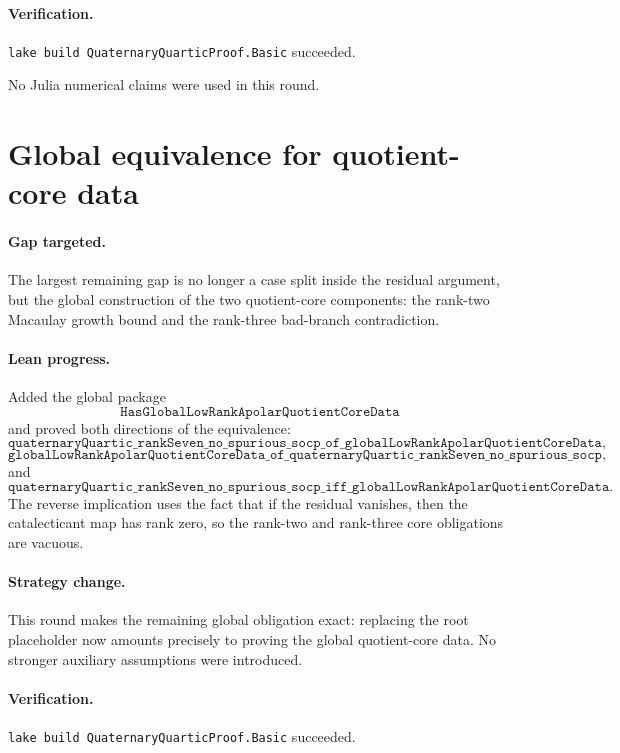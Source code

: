 \documentclass[11pt]{article}
\begin{document}
\paragraph{Verification.}
\texttt{lake build QuaternaryQuarticProof.Basic} succeeded.

No Julia numerical claims were used in this round.

\section*{Global equivalence for quotient-core data}

\paragraph{Gap targeted.}
The largest remaining gap is no longer a case split inside the residual
argument, but the global construction of the two quotient-core components:
the rank-two Macaulay growth bound and the rank-three bad-branch
contradiction.

\paragraph{Lean progress.}
Added the global package
\[
\texttt{HasGlobalLowRankApolarQuotientCoreData}
\]
and proved both directions of the equivalence:
\[
\texttt{quaternaryQuartic\_rankSeven\_no\_spurious\_socp\_of\_globalLowRankApolarQuotientCoreData},
\]
\[
\texttt{globalLowRankApolarQuotientCoreData\_of\_quaternaryQuartic\_rankSeven\_no\_spurious\_socp},
\]
and
\[
\texttt{quaternaryQuartic\_rankSeven\_no\_spurious\_socp\_iff\_globalLowRankApolarQuotientCoreData}.
\]
The reverse implication uses the fact that if the residual vanishes, then the
catalecticant map has rank zero, so the rank-two and rank-three core
obligations are vacuous.

\paragraph{Strategy change.}
This round makes the remaining global obligation exact: replacing the root
placeholder now amounts precisely to proving the global quotient-core data.
No stronger auxiliary assumptions were introduced.

\paragraph{Verification.}
\texttt{lake build QuaternaryQuarticProof.Basic} succeeded.
\end{document}
